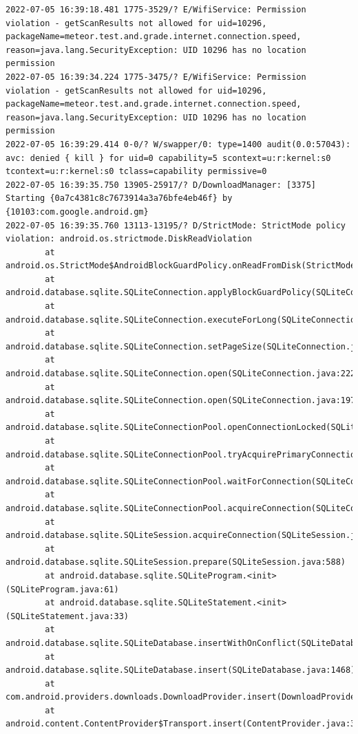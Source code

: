 \documentclass[a4paper,12pt]{book}
\begin{document}
\begin{lstlisting}
2022-07-05 16:39:18.481 1775-3529/? E/WifiService: Permission violation - getScanResults not allowed for uid=10296, packageName=meteor.test.and.grade.internet.connection.speed, reason=java.lang.SecurityException: UID 10296 has no location permission
2022-07-05 16:39:34.224 1775-3475/? E/WifiService: Permission violation - getScanResults not allowed for uid=10296, packageName=meteor.test.and.grade.internet.connection.speed, reason=java.lang.SecurityException: UID 10296 has no location permission
2022-07-05 16:39:29.414 0-0/? W/swapper/0: type=1400 audit(0.0:57043): avc: denied { kill } for uid=0 capability=5 scontext=u:r:kernel:s0 tcontext=u:r:kernel:s0 tclass=capability permissive=0
2022-07-05 16:39:35.750 13905-25917/? D/DownloadManager: [3375] Starting {0a7c4381c8c7673914a3a76bfe4eb46f} by {10103:com.google.android.gm}
2022-07-05 16:39:35.760 13113-13195/? D/StrictMode: StrictMode policy violation: android.os.strictmode.DiskReadViolation
        at android.os.StrictMode$AndroidBlockGuardPolicy.onReadFromDisk(StrictMode.java:1571)
        at android.database.sqlite.SQLiteConnection.applyBlockGuardPolicy(SQLiteConnection.java:1138)
        at android.database.sqlite.SQLiteConnection.executeForLong(SQLiteConnection.java:688)
        at android.database.sqlite.SQLiteConnection.setPageSize(SQLiteConnection.java:260)
        at android.database.sqlite.SQLiteConnection.open(SQLiteConnection.java:222)
        at android.database.sqlite.SQLiteConnection.open(SQLiteConnection.java:197)
        at android.database.sqlite.SQLiteConnectionPool.openConnectionLocked(SQLiteConnectionPool.java:505)
        at android.database.sqlite.SQLiteConnectionPool.tryAcquirePrimaryConnectionLocked(SQLiteConnectionPool.java:949)
        at android.database.sqlite.SQLiteConnectionPool.waitForConnection(SQLiteConnectionPool.java:699)
        at android.database.sqlite.SQLiteConnectionPool.acquireConnection(SQLiteConnectionPool.java:380)
        at android.database.sqlite.SQLiteSession.acquireConnection(SQLiteSession.java:896)
        at android.database.sqlite.SQLiteSession.prepare(SQLiteSession.java:588)
        at android.database.sqlite.SQLiteProgram.<init>(SQLiteProgram.java:61)
        at android.database.sqlite.SQLiteStatement.<init>(SQLiteStatement.java:33)
        at android.database.sqlite.SQLiteDatabase.insertWithOnConflict(SQLiteDatabase.java:1597)
        at android.database.sqlite.SQLiteDatabase.insert(SQLiteDatabase.java:1468)
        at com.android.providers.downloads.DownloadProvider.insert(DownloadProvider.java:972)
        at android.content.ContentProvider$Transport.insert(ContentProvider.java:309)

\end{lstlisting}
\end{document}
